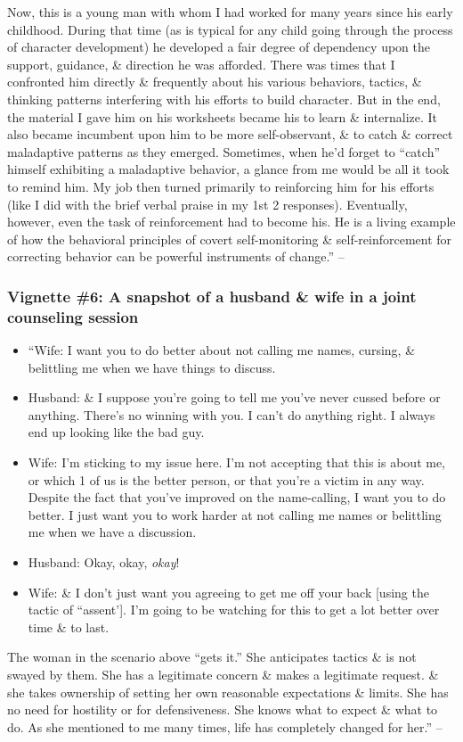 \documentclass{article}
\numberwithin{equation}{section}
\begin{document}
Now, this is a young man with whom I had worked for many years since his early childhood. During that time (as is typical for any child going through the process of character development) he developed a fair degree of dependency upon the support, guidance, \& direction he was afforded. There was times that I confronted him directly \& frequently about his various behaviors, tactics, \& thinking patterns interfering with his efforts to build character. But in the end, the material I gave him on his worksheets became his to learn \& internalize. It also became incumbent upon him to be more self-observant, \& to catch \& correct maladaptive patterns as they emerged. Sometimes, when he'd forget to ``catch'' himself exhibiting a maladaptive behavior, a glance from me would be all it took to remind him. My job then turned primarily to reinforcing him for his efforts (like I did with the brief verbal praise in my 1st 2 responses). Eventually, however, even the task of reinforcement had to become his. He is a living example of how the behavioral principles of covert self-monitoring \& self-reinforcement for correcting behavior can be powerful instruments of change.'' -- \cite[pp. 232--233]{Simon2011}

\subsubsection{Vignette \#6: A snapshot of a husband \& wife in a joint counseling session}

\begin{itemize}
	\item ``Wife: I want you to do better about not calling me names, cursing, \& belittling me when we have things to discuss.
	\item Husband: \& I suppose you're going to tell me you've never cussed before or anything. There's no winning with you. I can't do anything right. I always end up looking like the bad guy.
	\item Wife: I'm sticking to my issue here. I'm not accepting that this is about me, or which 1 of us is the better person, or that you're a victim in any way. Despite the fact that you've improved on the name-calling, I want you to do better. I just want you to work harder at not calling me names or belittling me when we have a discussion.
	\item Husband: Okay, okay, \textit{okay}!
	\item Wife: \& I don't just want you agreeing to get me off your back [using the tactic of ``assent']. I'm going to be watching for this to get a lot better over time \& to last.
\end{itemize}
The woman in the scenario above ``gets it.'' She anticipates tactics \& is not swayed by them. She has a legitimate concern \& makes a legitimate request. \& she takes ownership of setting her own reasonable expectations \& limits. She has no need for hostility or for defensiveness. She knows what to expect \& what to do. As she mentioned to me many times, life has completely changed for her.'' -- \cite[pp. 233--234]{Simon2011}
\end{document}
